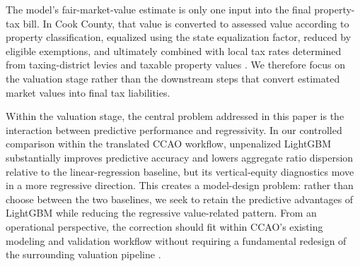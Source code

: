\documentclass[10pt]{article}
\theoremstyle{definition}
\newcommand{\1}{\mathbf{1}}
\begin{document}
{The model's fair-market-value estimate is only one input into the final property-tax bill. In Cook County, that value is converted to assessed value according to property classification, equalized using the state equalization factor, reduced by eligible exemptions, and ultimately combined with local tax rates determined from taxing-district levies and taxable property values \cite{CCAOAssessmentNotice2026,CCAOPropertyTaxSystem2026}. We therefore focus on the valuation stage rather than the downstream steps that convert estimated market values into final tax liabilities.}


{Within the valuation stage, the central problem addressed in this paper is the interaction between predictive performance and regressivity. In our controlled comparison within the translated CCAO workflow, unpenalized LightGBM substantially improves predictive accuracy and lowers aggregate ratio dispersion relative to the linear-regression baseline, but its vertical-equity diagnostics move in a more regressive direction. This creates a model-design problem: rather than choose between the two baselines, we seek to retain the predictive advantages of LightGBM while reducing the regressive value-related pattern. From an operational perspective, the correction should fit within CCAO's existing modeling and validation workflow without requiring a fundamental redesign of the surrounding valuation pipeline \cite{CCAOModelResAVM2026}.}

\end{document}
